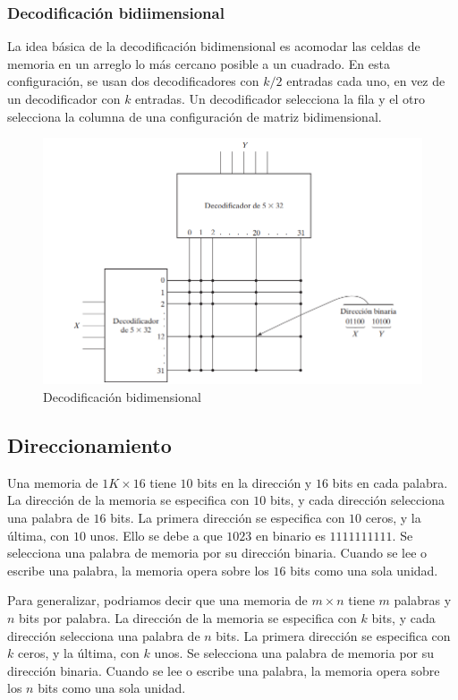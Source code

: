 \subsubsection{Decodificación bidiimensional}
La idea básica de la decodificación bidimensional es acomodar las celdas de memoria en un arreglo lo más cercano posible a un cuadrado. En esta configuración, se usan dos decodificadores con $k/2$ entradas cada uno, en vez de un decodificador con $k$ entradas. Un decodificador selecciona la fila y el otro selecciona la columna de una configuración de matriz bidimensional.

\begin{figure}[h]
\centering
\includegraphics[scale=0.69]{img/decbi.png}
\caption{Decodificación bidimensional}
\label{fig:memfoto4}
\end{figure}

\subsection{Direccionamiento}
Una memoria de $1K \times 16$ tiene $10$ bits en la dirección y $16$ bits en cada palabra. La dirección de la memoria se especifica con $10$ bits, y cada dirección selecciona una palabra de $16$ bits. La primera dirección se especifica con $10$ ceros, y la última, con $10$ unos. Ello se debe a que $1023$ en binario es $1111111111$. Se selecciona una palabra de memoria por su dirección binaria. Cuando se lee o escribe una palabra, la memoria opera sobre los $16$ bits como una sola unidad.

\begin{mdframed}[backgroundcolor=gray!10,linewidth=0]
    Para generalizar, podriamos decir que una memoria de $m \times n$ tiene $m$ palabras y $n$ bits por palabra. La dirección de la memoria se especifica con $k$ bits, y cada dirección selecciona una palabra de $n$ bits. La primera dirección se especifica con $k$ ceros, y la última, con $k$ unos. Se selecciona una palabra de memoria por su dirección binaria. Cuando se lee o escribe una palabra, la memoria opera sobre los $n$ bits como una sola unidad.
\end{mdframed}

